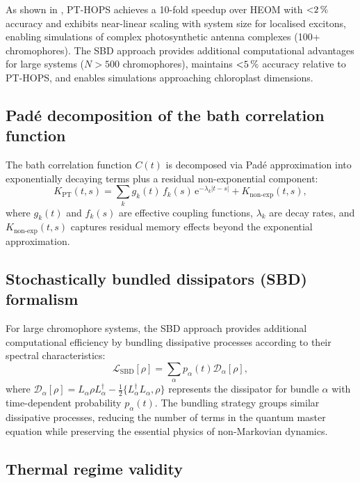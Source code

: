 \documentclass[11pt,a4paper]{article}
\begin{document}
As shown in , PT-HOPS achieves a \num{10}-fold speedup over HEOM with $\SI{<2}{\percent}$ accuracy and exhibits near-linear scaling with system size for localised excitons, enabling simulations of complex photosynthetic antenna complexes (100+ chromophores). The SBD approach provides additional computational advantages for large systems ($N >\num{500}$ chromophores), maintains $\SI{< 5}{\percent}$ accuracy relative to PT-HOPS, and enables simulations approaching chloroplast dimensions.

\subsection{Padé decomposition of the bath correlation function}

The bath correlation function $C(t)$ is decomposed via Pad\'e approximation into exponentially decaying terms plus a residual non-exponential component:
\begin{equation}
K_{\mathrm{PT}}(t,s) = \sum_{k} g_k(t)\, f_k(s)\, \mathrm{e}^{-\lambda_k |t-s|} + K_{\mathrm{non\text{-}exp}}(t,s),
\end{equation}
where $g_k(t)$ and $f_k(s)$ are effective coupling functions, $\lambda_k$ are decay rates, and $K_{\mathrm{non\text{-}exp}}(t,s)$ captures residual memory effects beyond the exponential approximation.

\subsection{Stochastically bundled dissipators (SBD) formalism}

For large chromophore systems, the SBD approach provides additional computational efficiency by bundling dissipative processes according to their spectral characteristics:
\begin{equation}
\mathcal{L}_{\mathrm{SBD}}[\rho] = \sum_{\alpha} p_{\alpha}(t) \mathcal{D}_{\alpha}[\rho],
\end{equation}
where $\mathcal{D}_{\alpha}[\rho] = L_{\alpha} \rho L_{\alpha}^{\dagger} - \frac{1}{2}\{L_{\alpha}^{\dagger}L_{\alpha}, \rho\}$ represents the dissipator for bundle $\alpha$ with time-dependent probability $p_{\alpha}(t)$. The bundling strategy groups similar dissipative processes, reducing the number of terms in the quantum master equation while preserving the essential physics of non-Markovian dynamics.

\subsection{Thermal regime validity}
\end{document}
